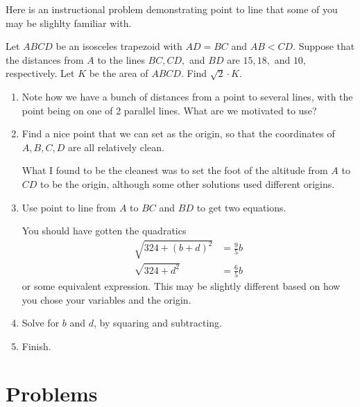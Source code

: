 \documentclass{article}
\begin{document}
Here is an instructional problem demonstrating point to line that some of you may be slighlty familiar with. 
\begin{exam}
Let $ABCD$ be an isosceles trapezoid with $AD=BC$ and $AB<CD.$ Suppose that the distances from $A$ to the lines $BC,CD,$ and $BD$ are $15,18,$ and $10,$ respectively. Let $K$ be the area of $ABCD.$ Find $\sqrt2 \cdot K.$
\end{exam}

\begin{walk}

\begin{enumerate}[label=(\alph*)]
    \item Note how we have a bunch of distances from a point to several lines, with the point being on one of 2 parallel lines. What are we motivated to use?
    \item Find a nice point that we can set as the origin, so that the coordinates of $A,B,C,D$ are all relatively clean.
    
    What I found to be the cleanest was to set the foot of the altitude from $A$ to $CD$ to be the origin, although some other solutions used different origins. 
    
    \item Use point to line from $A$ to $BC$ and $BD$ to get two equations.
    
    You should have gotten the quadratics 
    \begin{align*}
        \sqrt{324+(b+d)^2}&=\frac{9}{5}b\\
        \sqrt{324+d^2}&=\frac{6}{5}b
    \end{align*}
    or some equivalent expression. This may be slightly different based on how you chose your variables and the origin. 
    \item Solve for $b$ and $d$, by squaring and subtracting. 
    \item Finish. 
\end{enumerate}

\end{walk}

\pagebreak
\section{Problems}



\end{document}
